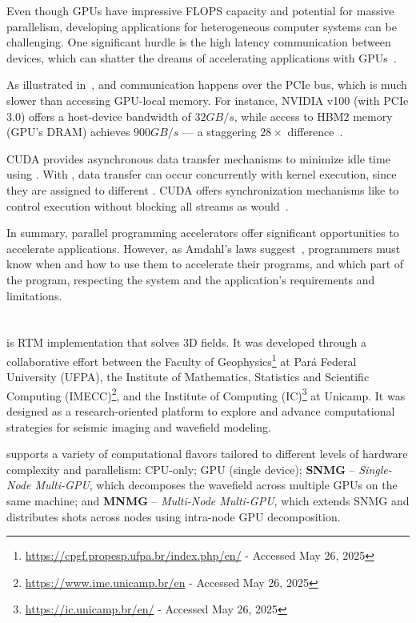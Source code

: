 \documentclass[Ingles,Final]{ic-tese-v3}
\begin{document}
Even though GPUs have impressive FLOPS capacity and potential for massive parallelism, developing applications for heterogeneous computer systems can be challenging. One significant hurdle is the high latency communication between devices, which can shatter the dreams of accelerating applications with GPUs~\cite{kirk,cuda,liu2012}. 

As illustrated in~, \dth and \htd communication happens over the PCIe bus\cite{kirk}, which is much slower than accessing GPU-local memory. For instance, NVIDIA v100 (with PCIe 3.0) offers a host-device bandwidth of $32 GB/s$, while access to HBM2 memory (GPU's DRAM) achieves $900 GB/s$ --- a staggering $28\times$ difference~\cite{v100}.

CUDA provides asynchronous data transfer mechanisms to minimize idle time using . With , data transfer can occur concurrently with kernel execution, since they are assigned to different . CUDA offers synchronization mechanisms like  to control execution without blocking all streams as  would~\cite{kirk,cuda}.

In summary, parallel programming accelerators offer significant opportunities to accelerate applications. However, as Amdahl's laws suggest~\cite{hennessy}, programmers must know when and how to use them to accelerate their programs, and which part of the program, respecting the system and the application's requirements and limitations.

\section{\awave}
\label{sec:awave3d}

\awave is RTM implementation that solves 3D fields. It was developed through a collaborative effort between the Faculty of Geophysics\footnote{\url{https://cpgf.propesp.ufpa.br/index.php/en/} - Accessed May 26, 2025} at Pará Federal University (UFPA), the Institute of Mathematics, Statistics and Scientific Computing (IMECC)\footnote{\url{https://www.ime.unicamp.br/en} - Accessed May 26, 2025}, and the Institute of Computing (IC)\footnote{\url{https://ic.unicamp.br/en/} - Accessed May 26, 2025} at Unicamp. It was designed as a research-oriented platform to explore and advance computational strategies for seismic imaging and wavefield modeling.

\awave supports a variety of computational flavors tailored to different levels of hardware complexity and parallelism: CPU-only; GPU (single device); \textbf{SNMG} – \textit{Single-Node Multi-GPU}, which decomposes the wavefield across multiple GPUs on the same machine; and \textbf{MNMG} – \textit{Multi-Node Multi-GPU}, which extends SNMG and distributes shots across nodes using intra-node GPU decomposition.
\end{document}
